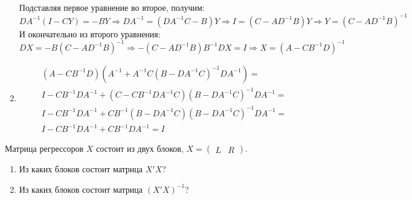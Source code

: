 \begin{problem}
\begin{sol}
\begin{enumerate}
\begin{align*}
\end{align*}
Подставляя первое уравнение во второе, получим:
\[
D A^{-1}(I-CY) = -BY \Rightarrow DA^{-1} = (DA^{-1}C- B)Y \Rightarrow I = (C - AD^{-1}B)Y \Rightarrow Y = (C - AD^{-1}B)^{-1}
\]
И окончательно из второго уравнения:
\[
DX = -B (C - AD^{-1}B)^{-1} \Rightarrow -(C - AD^{-1}B)B^{-1}DX = I \Rightarrow X = (A - CB^{-1}D)^{-1}
\]
\item
\begin{multline*}
(A - CB^{-1}D)(A^{-1} + A^{-1}C(B-DA^{-1}C)^{-1}DA^{-1}) = \\
I - CB^{-1}DA^{-1} + (C - CB^{-1}DA^{-1}C)(B-DA^{-1}C)^{-1}DA^{-1} = \\
I - CB^{-1}DA^{-1} + CB^{-1}(B - DA^{-1}C)(B-DA^{-1}C)^{-1}DA^{-1} = \\
I - CB^{-1}DA^{-1} + CB^{-1}DA^{-1} = I
\end{multline*}
\end{enumerate}
\end{sol}
\end{problem}

\begin{problem}
Матрица регрессоров $X$ состоит из двух блоков, $X=
\begin{pmatrix}
  L & R
\end{pmatrix}$.

\begin{enumerate}
  \item Из каких блоков состоит матрица $X'X$?
  \item Из каких блоков состоит матрица $(X'X)^{-1}$?
\end{enumerate}

\begin{sol}
\end{sol}

\end{problem}


\section{}

